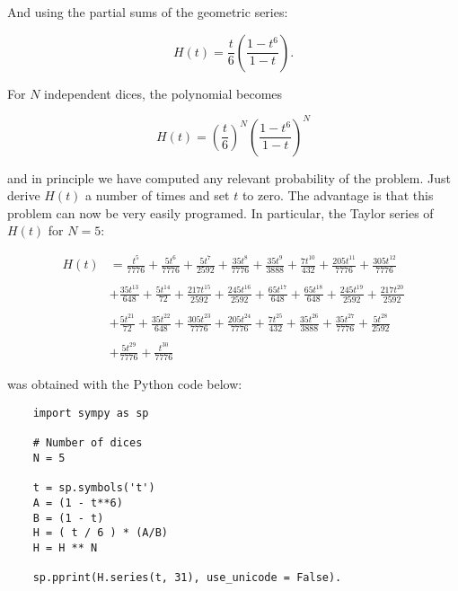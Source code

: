 \documentclass[12pt]{article}
\begin{document}
\noindent
And using the partial sums of the geometric series:

\begin{equation}
H(t) = 
\frac{t}{6} \left( \frac{1 - t^{6}}{1 - t} \right).
\end{equation}

\noindent
For $N$ independent dices, the polynomial becomes

\begin{equation}
H(t) = 
\left( \frac{t}{6} \right)^{N} \left( \frac{1 - t^{6}}{1 - t} \right)^{N}
\end{equation}

\noindent
and in principle we have computed any relevant probability of the problem. Just
derive $H(t)$ a number of times and set $t$ to zero.
The advantage is that this problem can now be very easily programed.
In particular, the Taylor series of $H(t)$ for $N = 5$:

\begin{align}
H(t) &=
\frac{t^{5}}{7776} + \frac{5 t^{6}}{7776} + \frac{5 t^{7}}{2592} + \frac{35 t^{8}}{7776} 
+ \frac{35 t^{9}}{3888} + \frac{7 t^{10}}{432} + \frac{205 t^{11}}{7776} + \frac{305 t^{12}}{7776} 
\nonumber \\
\nonumber \\
&+ \frac{35 t^{13}}{648} + \frac{5 t^{14}}{72} + \frac{217 t^{15}}{2592} + \frac{245 t^{16}}{2592} 
+ \frac{65 t^{17}}{648} + \frac{65 t^{18}}{648} + \frac{245 t^{19}}{2592} + \frac{217 t^{20}}{2592} 
\nonumber \\
\nonumber \\
&+ \frac{5 t^{21}}{72} + \frac{35 t^{22}}{648} + \frac{305 t^{23}}{7776} + \frac{205 t^{24}}{7776} 
+ \frac{7 t^{25}}{432} + \frac{35 t^{26}}{3888} + \frac{35 t^{27}}{7776} + \frac{5 t^{28}}{2592} 
\nonumber \\
\nonumber \\
&+ \frac{5 t^{29}}{7776} + \frac{t^{30}}{7776} 
\end{align}

\noindent
was obtained with the Python code below:

\begin{verbatim}
	import sympy as sp
	
	# Number of dices
	N = 5
	
	t = sp.symbols('t')
	A = (1 - t**6)
	B = (1 - t)
	H = ( t / 6 ) * (A/B)
	H = H ** N
	
	sp.pprint(H.series(t, 31), use_unicode = False).
\end{verbatim}
\end{document}
